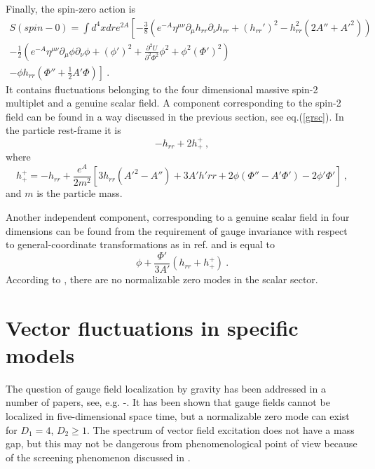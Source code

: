 \documentclass[a4paper,12pt]{article}
\begin{document}
Finally, the spin-zero action is
\begin{eqnarray}
\nonumber
S(spin-0) = \int d^4x dr e^{2A}\left[-\frac{3}{8}
\left(e^{-A}\eta^{\mu\nu}\partial_\mu h_{rr}\partial_\nu h_{rr}+
(h_{rr}')^2-h_{rr}^2(2A''+{A'}^2)\right)\right.\\
-\frac{1}{2}\left(e^{-A}\eta^{\mu\nu}\partial_\mu\phi\partial_\nu\phi+
(\phi')^2+\frac{\partial^2 U}{\partial^2 \Phi^2}\phi^2+
\phi^2(\Phi')^2\right) \\
\left. -\phi h_{rr}\left(\Phi'' + \frac{1}{2}A'\Phi\right)\right]~.
\nonumber
\label{spin0rs}
\end{eqnarray}
It contains fluctuations belonging to the four dimensional  massive
spin-2 multiplet and a genuine scalar field. A component
corresponding to the spin-2 field can be found in a way  discussed in
the previous section, see eq.(\ref{grsc}). In the particle rest-frame
it is
\begin{equation}
-h_{rr}+2 h^+_+~,
\end{equation}
where
\begin{equation}
h^+_+=-h_{rr}+\frac{e^A}{2m^2}\left[3 h_{rr}({A'}^2-A'') + 3 A'h'{rr}+
2 \phi(\Phi'' - A' \Phi') - 2 \phi' \Phi' \right]~,
\end{equation}
and $m$ is the particle mass.

Another independent component, corresponding to a genuine scalar
field in four dimensions can be found from the requirement of gauge
invariance with respect to general-coordinate transformations as in
ref. \cite{Giovannini:2001fh} and is equal to
\begin{equation}
\phi +\frac{\Phi'}{3A'}(h_{rr}+h^+_+)~.
\label{scalar}
\end{equation}
According to \cite{Giovannini:2001fh}, there are no normalizable zero
modes in the scalar sector.

\section{Vector fluctuations in specific models}
The question of gauge field localization by gravity has been
addressed in a number of papers, see, e.g.
\cite{Oda:2000zc}-\cite{Giovannini:2002jf}. It has been shown that
gauge fields cannot be localized in five-dimensional space time, but
a normalizable zero mode can exist for $D_1=4$, $D_2 \geq 1$. The
spectrum of vector field excitation does not have a mass gap, but
this may not be dangerous from phenomenological point of view because
of the screening phenomenon discussed in \cite{Dubovsky:2002xv}.
\end{document}
